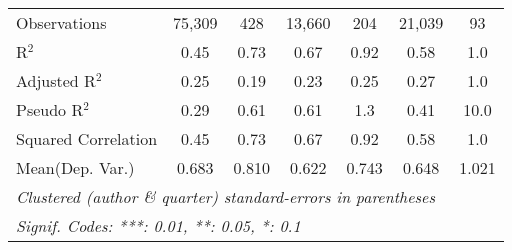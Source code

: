 \begin{tabular}{lcccccc}
   Observations                                               & 75,309      & 428        & 13,660  & 204          & 21,039  & 93\\  
   R$^2$                                                      & 0.45        & 0.73       & 0.67    & 0.92         & 0.58    & 1.0\\  
   Adjusted R$^2$                                             & 0.25        & 0.19       & 0.23    & 0.25         & 0.27    & 1.0\\  
   Pseudo R$^2$                                               & 0.29        & 0.61       & 0.61    & 1.3          & 0.41    & 10.0\\  
   Squared Correlation                                        & 0.45        & 0.73       & 0.67    & 0.92         & 0.58    & 1.0\\  
Mean(Dep. Var.) & 0.683 & 0.810 & 0.622 & 0.743 & 0.648 & 1.021 \\
   \midrule \midrule
   \multicolumn{7}{l}{\emph{Clustered (author \& quarter) standard-errors in parentheses}}\\
   \multicolumn{7}{l}{\emph{Signif. Codes: ***: 0.01, **: 0.05, *: 0.1}}\\
\end{tabular}
\par\endgroup
